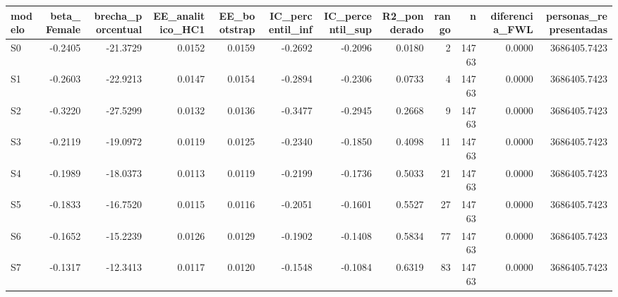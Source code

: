 \begin{tabular}{lrrrrrrrrrrr}
\toprule
modelo & beta\_Female & brecha\_porcentual & EE\_analitico\_HC1 & EE\_bootstrap & IC\_percentil\_inf & IC\_percentil\_sup & R2\_ponderado & rango & n & diferencia\_FWL & personas\_representadas \\
\midrule
S0 & -0.2405 & -21.3729 & 0.0152 & 0.0159 & -0.2692 & -0.2096 & 0.0180 & 2 & 14763 & 0.0000 & 3686405.7423 \\
S1 & -0.2603 & -22.9213 & 0.0147 & 0.0154 & -0.2894 & -0.2306 & 0.0733 & 4 & 14763 & 0.0000 & 3686405.7423 \\
S2 & -0.3220 & -27.5299 & 0.0132 & 0.0136 & -0.3477 & -0.2945 & 0.2668 & 9 & 14763 & 0.0000 & 3686405.7423 \\
S3 & -0.2119 & -19.0972 & 0.0119 & 0.0125 & -0.2340 & -0.1850 & 0.4098 & 11 & 14763 & 0.0000 & 3686405.7423 \\
S4 & -0.1989 & -18.0373 & 0.0113 & 0.0119 & -0.2199 & -0.1736 & 0.5033 & 21 & 14763 & 0.0000 & 3686405.7423 \\
S5 & -0.1833 & -16.7520 & 0.0115 & 0.0116 & -0.2051 & -0.1601 & 0.5527 & 27 & 14763 & 0.0000 & 3686405.7423 \\
S6 & -0.1652 & -15.2239 & 0.0126 & 0.0129 & -0.1902 & -0.1408 & 0.5834 & 77 & 14763 & 0.0000 & 3686405.7423 \\
S7 & -0.1317 & -12.3413 & 0.0117 & 0.0120 & -0.1548 & -0.1084 & 0.6319 & 83 & 14763 & 0.0000 & 3686405.7423 \\
\bottomrule
\end{tabular}
